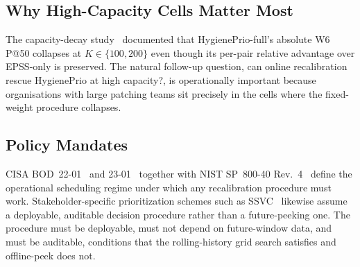 \subsection{Why High-Capacity Cells Matter Most}

The capacity-decay study~\cite{paper6capacity} documented that HygienePrio-full's
absolute W6 P@50 collapses at $K \in \{100, 200\}$ even though its
per-pair relative advantage over EPSS-only is preserved. The natural
follow-up question, can online recalibration rescue HygienePrio at
high capacity?, is operationally important because organisations
with large patching teams sit precisely in the cells where the
fixed-weight procedure collapses.

\subsection{Policy Mandates}

CISA BOD~22-01~\cite{cisa2021bod2201} and 23-01~\cite{cisa2022bod2301}
together with NIST SP~800-40 Rev.~4~\cite{nist2022sp80040r4} define the
operational scheduling regime under which any recalibration procedure
must work. Stakeholder-specific prioritization schemes such as
SSVC~\cite{spring2021ssvc} likewise assume a deployable, auditable
decision procedure rather than a future-peeking one. The procedure must be deployable, must not depend on
future-window data, and must be auditable, conditions that the
rolling-history grid search satisfies and offline-peek does not.
